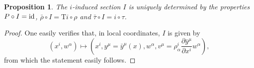 \documentclass[11pt]{article}
\theoremstyle{plain}
\newtheorem{proposition}{Proposition}
\theoremstyle{definition}
\begin{document}
\begin{proposition} \label{prop2}
The $i$-induced section $I$ is uniquely determined by the properties $P\circ I = {\rm id}$, $\bar{\rho}\circ I=\mathrm{T}i\circ \rho$ and $\bar{\tau}\circ I=i\circ \tau$.
\end{proposition}
\begin{proof} One easily verifies that, in local coordinates, $I$ is given by
\begin{equation*}
    (x^i,w^{\alpha})\longmapsto \left(x^i,y^{\mu}=\bar{y}^{\mu}(x),w^{\alpha},v^{\mu}=\rho_{\alpha}^i \frac{\partial \bar{y}^{\mu}}{\partial x^i} w^{\alpha}\right),
\end{equation*}
from which the statement easily follows.
\end{proof}


\end{document}
